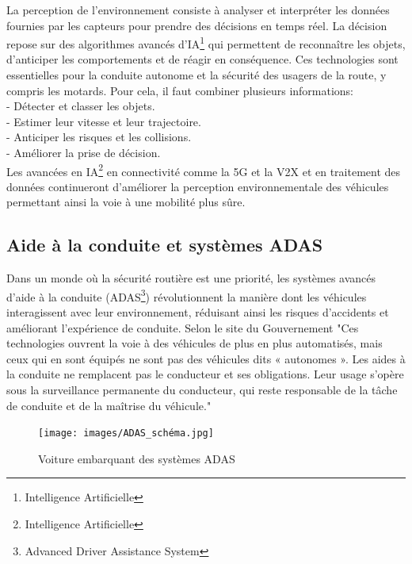 \documentclass{article}
\begin{document}

La perception de l'environnement consiste à analyser et interpréter les données fournies par les capteurs pour prendre des décisions en temps réel. La décision repose sur des algorithmes avancés d'IA\footnote{Intelligence Artificielle} qui permettent de reconnaître les objets, d'anticiper les comportements et de réagir en conséquence. Ces technologies sont essentielles pour la conduite autonome et la sécurité des usagers de la route, y compris les motards.
Pour cela, il faut combiner plusieurs informations:\\
- Détecter et classer les objets. \\
- Estimer leur vitesse et leur trajectoire. \\
- Anticiper les risques et les collisions. \\
- Améliorer la prise de décision.\\
Les avancées en IA\footnote{Intelligence Artificielle} en connectivité comme la 5G et la V2X et en traitement des données continueront d’améliorer la perception environnementale des véhicules permettant ainsi la voie à une mobilité plus sûre.

\subsection{Aide à la conduite et systèmes ADAS}
Dans un monde où la sécurité routière est une priorité, les systèmes avancés d’aide à la conduite (ADAS\footnote{Advanced Driver Assistance System}) révolutionnent la manière dont les véhicules interagissent avec leur environnement, réduisant ainsi les risques d’accidents et améliorant l’expérience de conduite.
Selon le site du Gouvernement \cite{adas_gouv} "Ces technologies ouvrent la voie à des véhicules de plus en plus automatisés, mais ceux qui en sont équipés ne sont pas des véhicules dits « autonomes ». Les aides à la conduite ne remplacent pas le conducteur et ses obligations. Leur usage s’opère sous la surveillance permanente du conducteur, qui reste responsable de la tâche de conduite et de la maîtrise du véhicule."
\begin{figure}[h]
    \centering
    \texttt{[image: images/ADAS\_schéma.jpg]} 
    \caption{Voiture embarquant des systèmes ADAS\cite{continental_adas}}
\end{figure}
\end{document}
